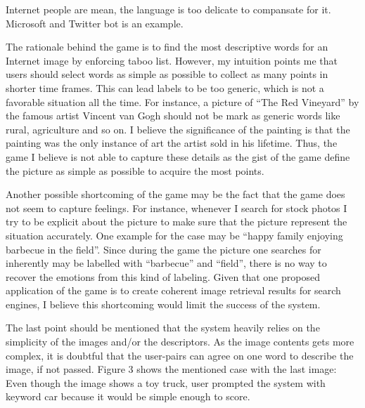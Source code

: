 \documentclass[11pt]{article}
\begin{document}
Internet people are mean, the language is too delicate to compansate for it.
Microsoft and Twitter bot is an example.


The rationale behind the game is to find the most descriptive words for an Internet image by enforcing taboo list.
However, my intuition points me that users should select words as simple as possible to collect as many points in shorter time frames.
This can lead labels to be too generic, which is not a favorable situation all the time.
For instance, a picture of ``The Red Vineyard'' by the famous artist Vincent van Gogh should not be mark as generic words like rural, agriculture and so on.
I believe the significance of the painting is that the painting was the only instance of art the artist sold in his lifetime.
Thus, the game I believe is not able to capture these details as the gist of the game define the picture as simple as possible to acquire the most points.

Another possible shortcoming of the game may be the fact that the game does not seem to capture feelings.
For instance, whenever I search for stock photos I try to be explicit about the picture to make sure that the picture represent the situation accurately.
One example for the case may be ``happy family enjoying barbecue in the field''.
Since during the game the picture one searches for inherently may be labelled with ``barbecue'' and ``field'', there is no way to recover the emotions from this kind of labeling.
Given that one proposed application of the game is to create coherent image retrieval results for search engines, I believe this shortcoming would limit the success of the system.

The last point should be mentioned that the system heavily relies on the simplicity of the images and/or the descriptors.
As the image contents gets more complex, it is doubtful that the user-pairs can agree on one word to describe the image, if not passed.
Figure 3 shows the mentioned case with the last image: Even though the image shows a toy truck, user prompted the system with keyword car because it would be simple enough to score.

% 
% 
\end{document}

